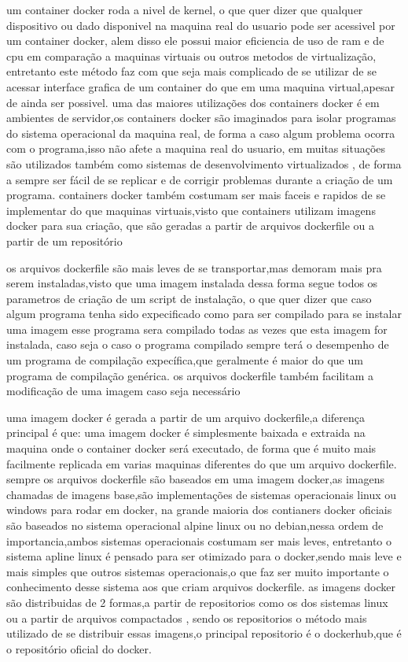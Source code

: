 \documentclass[
	12pt,				%
	openright,			%
	oneside,			%
	a4paper,			%
	english,			%
	french,				%
	spanish,			%
	brazil,				%
	]{abntex2}
\begin{document}
um container docker roda a nivel de kernel, o que quer dizer que qualquer dispositivo ou dado disponivel na maquina real do usuario pode ser acessivel por um container docker,
alem disso ele possui maior eficiencia de uso de ram e de cpu em comparação a maquinas virtuais ou outros metodos de virtualização,
entretanto este método faz com que seja mais complicado de se utilizar de se acessar interface grafica de um container do que em uma maquina virtual,apesar de ainda ser possivel.
uma das maiores utilizações dos containers docker é em ambientes de servidor,os containers docker são imaginados para isolar programas do sistema operacional da maquina real,
de forma a caso algum problema ocorra com o programa,isso não afete a maquina real do usuario, em muitas situações são utilizados também como sistemas de desenvolvimento virtualizados ,
de forma a sempre ser fácil de se replicar e de corrigir problemas durante a criação de um programa.
containers docker também costumam ser mais faceis e rapidos de se implementar do que maquinas virtuais,visto que containers utilizam imagens docker para sua criação,
que são geradas a partir de arquivos dockerfile ou a partir de um repositório


os arquivos dockerfile são mais leves de se transportar,mas demoram mais pra serem instaladas,visto que uma imagem instalada dessa forma segue todos os parametros de criação de um script de instalação,
o que quer dizer que caso algum programa tenha sido expecificado como para ser compilado para se instalar uma imagem esse programa sera compilado todas as vezes que esta imagem for instalada,
caso seja o caso o programa compilado sempre terá o desempenho de um programa de compilação expecífica,que geralmente é maior do que um programa de compilação genérica.
os arquivos dockerfile também facilitam a modificação de uma imagem caso seja necessário


uma imagem docker é gerada a partir de um arquivo dockerfile,a diferença principal é que: uma imagem docker é simplesmente baixada e extraida na maquina onde o container docker será executado,
de forma que é muito mais facilmente replicada em varias maquinas diferentes do que um arquivo dockerfile.
sempre os arquivos dockerfile são baseados em uma imagem docker,as imagens chamadas de imagens base,são implementações de sistemas operacionais linux ou windows para rodar em docker,
na grande maioria dos contianers docker oficiais são baseados no sistema operacional alpine linux ou no debian,nessa ordem de importancia,ambos sistemas operacionais costumam ser mais leves,
entretanto o sistema apline linux é pensado para ser otimizado para o docker,sendo mais leve e mais simples que outros sistemas operacionais,o que faz ser muito importante o conhecimento desse sistema aos que criam arquivos dockerfile.
as imagens docker são distribuidas de 2 formas,a partir de repositorios como os dos sistemas linux ou a partir de arquivos compactados ,
sendo os repositorios o método mais utilizado de se distribuir essas imagens,o principal repositorio é o dockerhub,que é o repositório oficial do docker.
\end{document}
